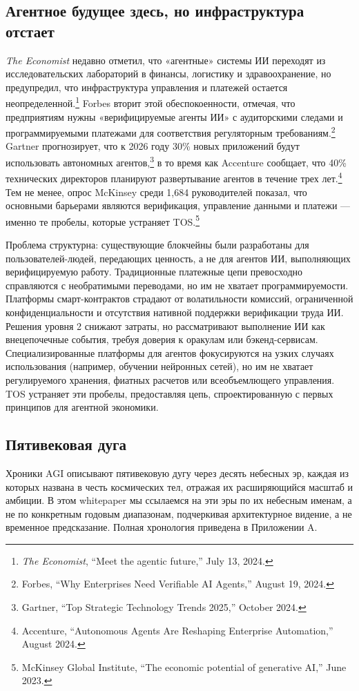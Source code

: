 \documentclass[11pt]{article}
\begin{document}
\subsection{Агентное будущее здесь, но инфраструктура отстает}
\emph{The Economist} недавно отметил, что «агентные» системы ИИ переходят из исследовательских лабораторий в финансы, логистику и здравоохранение, но предупредил, что инфраструктура управления и платежей остается неопределенной.\footnote{\emph{The Economist}, ``Meet the agentic future,'' July 13, 2024.} Forbes вторит этой обеспокоенности, отмечая, что предприятиям нужны «верифицируемые агенты ИИ» с аудиторскими следами и программируемыми платежами для соответствия регуляторным требованиям.\footnote{Forbes, ``Why Enterprises Need Verifiable AI Agents,'' August 19, 2024.} Gartner прогнозирует, что к 2026 году 30\% новых приложений будут использовать автономных агентов,\footnote{Gartner, ``Top Strategic Technology Trends 2025,'' October 2024.} в то время как Accenture сообщает, что 40\% технических директоров планируют развертывание агентов в течение трех лет.\footnote{Accenture, ``Autonomous Agents Are Reshaping Enterprise Automation,'' August 2024.} Тем не менее, опрос McKinsey среди 1,684 руководителей показал, что основными барьерами являются верификация, управление данными и платежи — именно те пробелы, которые устраняет TOS.\footnote{McKinsey Global Institute, ``The economic potential of generative AI,'' June 2023.}

Проблема структурна: существующие блокчейны были разработаны для пользователей-людей, передающих ценность, а не для агентов ИИ, выполняющих верифицируемую работу. Традиционные платежные цепи превосходно справляются с необратимыми переводами, но им не хватает программируемости. Платформы смарт-контрактов страдают от волатильности комиссий, ограниченной конфиденциальности и отсутствия нативной поддержки верификации труда ИИ. Решения уровня 2 снижают затраты, но рассматривают выполнение ИИ как внецепочечные события, требуя доверия к оракулам или бэкенд-сервисам. Специализированные платформы для агентов фокусируются на узких случаях использования (например, обучении нейронных сетей), но им не хватает регулируемого хранения, фиатных расчетов или всеобъемлющего управления. TOS устраняет эти пробелы, предоставляя цепь, спроектированную с первых принципов для агентной экономики.

\subsection{Пятивековая дуга}
Хроники AGI описывают пятивековую дугу через десять небесных эр, каждая из которых названа в честь космических тел, отражая их расширяющийся масштаб и амбиции. В этом whitepaper мы ссылаемся на эти эры по их небесным именам, а не по конкретным годовым диапазонам, подчеркивая архитектурное видение, а не временное предсказание. Полная хронология приведена в Приложении A.
\end{document}
